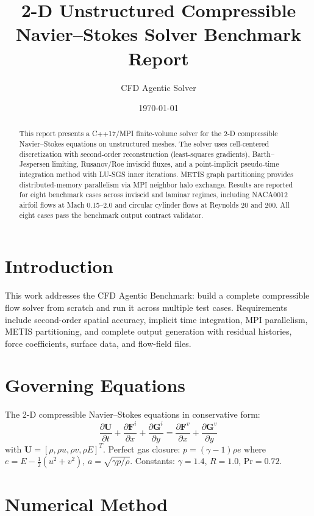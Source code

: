 \documentclass[11pt]{article}
\title{2-D Unstructured Compressible Navier--Stokes Solver Benchmark Report}
\author{CFD Agentic Solver}
\date{\today}
\begin{document}
\maketitle

\begin{abstract}
This report presents a C++17/MPI finite-volume solver for the 2-D compressible
Navier--Stokes equations on unstructured meshes. The solver uses cell-centered
discretization with second-order reconstruction (least-squares gradients),
Barth--Jespersen limiting, Rusanov/Roe inviscid fluxes, and a point-implicit
pseudo-time integration method with LU-SGS inner iterations. METIS graph
partitioning provides distributed-memory parallelism via MPI neighbor halo
exchange. Results are reported for eight benchmark cases across inviscid and
laminar regimes, including NACA0012 airfoil flows at Mach 0.15--2.0 and
circular cylinder flows at Reynolds 20 and 200. All eight cases pass the
benchmark output contract validator.
\end{abstract}

\section{Introduction}

This work addresses the CFD Agentic Benchmark: build a complete compressible
flow solver from scratch and run it across multiple test cases. Requirements
include second-order spatial accuracy, implicit time integration, MPI
parallelism, METIS partitioning, and complete output generation with residual
histories, force coefficients, surface data, and flow-field files.

\section{Governing Equations}

The 2-D compressible Navier--Stokes equations in conservative form:
\begin{equation}
\frac{\partial \mathbf{U}}{\partial t}
+ \frac{\partial \mathbf{F}^i}{\partial x} + \frac{\partial \mathbf{G}^i}{\partial y}
= \frac{\partial \mathbf{F}^v}{\partial x} + \frac{\partial \mathbf{G}^v}{\partial y}
\end{equation}
with $\mathbf{U}=[\rho,\rho u,\rho v,\rho E]^T$. Perfect gas closure:
$p = (\gamma-1)\rho e$ where $e = E - \frac{1}{2}(u^2+v^2)$,
$a = \sqrt{\gamma p/\rho}$. Constants: $\gamma=1.4$, $R=1.0$, $\text{Pr}=0.72$.

\section{Numerical Method}
\end{document}

